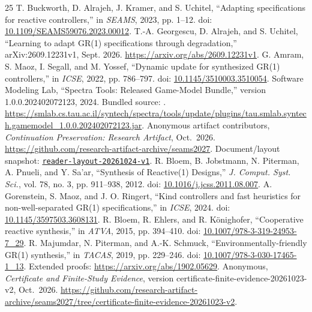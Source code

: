 \begin{thebibliography}{25}
T. Buckworth, D. Alrajeh, J. Kramer, and S. Uchitel, ``Adapting specifications for reactive controllers,'' in \emph{SEAMS}, 2023, pp. 1--12. doi: \href{https://doi.org/10.1109/SEAMS59076.2023.00012}{10.1109/SEAMS59076.2023.00012}.
T.-A. Georgescu, D. Alrajeh, and S. Uchitel, ``Learning to adapt GR(1) specifications through degradation,'' arXiv:2609.12231v1, Sept. 2026. \url{https://arxiv.org/abs/2609.12231v1}.
G. Amram, S. Maoz, I. Segall, and M. Yossef, ``Dynamic update for synthesized GR(1) controllers,'' in \emph{ICSE}, 2022, pp. 786--797. doi: \href{https://doi.org/10.1145/3510003.3510054}{10.1145/3510003.3510054}.
Software Modeling Lab, ``Spectra Tools: Released Game-Model Bundle,'' version 1.0.0.202402072123, 2024. Bundled source: . \url{https://smlab.cs.tau.ac.il/syntech/spectra/tools/update/plugins/tau.smlab.syntech.gamemodel_1.0.0.202402072123.jar}.
Anonymous artifact contributors, \emph{Continuation Preservation: Research Artifact}, Oct.~2026. \url{https://github.com/research-artifact-archive/seams2027}. Document/layout snapshot: \href{https://github.com/research-artifact-archive/seams2027/tree/reader-layout-20261024-v1}{\nolinkurl{reader-layout-20261024-v1}}.
R. Bloem, B. Jobstmann, N. Piterman, A. Pnueli, and Y. Sa'ar, ``Synthesis of Reactive(1) Designs,'' \emph{J. Comput. Syst. Sci.}, vol. 78, no. 3, pp. 911--938, 2012. doi: \href{https://doi.org/10.1016/j.jcss.2011.08.007}{10.1016/j.jcss.2011.08.007}.
A. Gorenstein, S. Maoz, and J. O. Ringert, ``Kind controllers and fast heuristics for non-well-separated GR(1) specifications,'' in \emph{ICSE}, 2024. doi: \href{https://doi.org/10.1145/3597503.3608131}{10.1145/3597503.3608131}.
R. Bloem, R. Ehlers, and R. K\"onighofer, ``Cooperative reactive synthesis,'' in \emph{ATVA}, 2015, pp. 394--410. doi: \href{https://doi.org/10.1007/978-3-319-24953-7_29}{10.1007/978-3-319-24953-7\_29}.
R. Majumdar, N. Piterman, and A.-K. Schmuck, ``Environmentally-friendly GR(1) synthesis,'' in \emph{TACAS}, 2019, pp. 229--246. doi: \href{https://doi.org/10.1007/978-3-030-17465-1_13}{10.1007/978-3-030-17465-1\_13}. Extended proofs: \url{https://arxiv.org/abs/1902.05629}.
Anonymous, \emph{Certificate and Finite-Study Evidence}, version certificate-finite-evidence-20261023-v2, Oct.~2026. \url{https://github.com/research-artifact-archive/seams2027/tree/certificate-finite-evidence-20261023-v2}.

\end{thebibliography}
